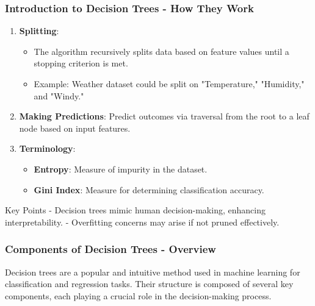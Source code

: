 \documentclass{beamer}
\begin{document}
\begin{frame}[fragile]
    \frametitle{Introduction to Decision Trees - How They Work}
    
    \begin{enumerate}
        \item \textbf{Splitting}: 
            \begin{itemize}
                \item The algorithm recursively splits data based on feature values until a stopping criterion is met.
                \item Example: Weather dataset could be split on "Temperature," "Humidity," and "Windy."
            \end{itemize}
        \item \textbf{Making Predictions}: 
            Predict outcomes via traversal from the root to a leaf node based on input features.
        \item \textbf{Terminology}:
            \begin{itemize}
                \item \textbf{Entropy}: Measure of impurity in the dataset.
                \item \textbf{Gini Index}: Measure for determining classification accuracy.
            \end{itemize}
    \end{enumerate}
    
    \begin{block}{Key Points}
        - Decision trees mimic human decision-making, enhancing interpretability. 
        - Overfitting concerns may arise if not pruned effectively.
    \end{block}
\end{frame}

\begin{frame}[fragile]
    \frametitle{Components of Decision Trees - Overview}
    Decision trees are a popular and intuitive method used in machine learning for classification and regression tasks. 
    Their structure is composed of several key components, each playing a crucial role in the decision-making process.
\end{frame}
\end{document}
